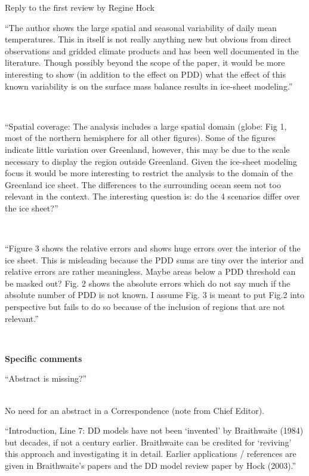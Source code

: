 \documentclass{letter}
\newcommand{\rev}[0]{\color{blue!50!black}\it}
\newcommand{\revpoint}[1]{{\rev\item``#1''}\\}
\begin{document}
\begin{letter}{Reply to the first review by Regine Hock}
\begin{enumerate}[resume]
    \revpoint{The author shows the large spatial and seasonal variability of daily mean temperatures. This in itself is not really anything new but obvious from direct observations and gridded climate products and has been well documented in the literature. Though possibly beyond the scope of the paper, it would be more interesting to show (in addition to the effect on PDD) what the effect of this known variability is on the surface mass balance results in ice-sheet modeling.}

    \revpoint{Spatial coverage: The analysis includes a large spatial domain (globe: Fig 1, most of the northern hemisphere for all other figures). Some of the figures indicate little variation over Greenland, however, this may be due to the scale necessary to display the region outside Greenland. Given the ice-sheet modeling focus it would be more interesting to restrict the analysis to the domain of the Greenland ice sheet. The differences to the surrounding ocean seem not too relevant in the context. The interesting question is: do the 4 scenarios differ over the ice sheet?}

    \revpoint{Figure 3 shows the relative errors and shows huge errors over the interior of the ice sheet. This is misleading because the PDD sums are tiny over the interior and relative errors are rather meaningless. Maybe areas below a PDD threshold can be masked out? Fig. 2 shows the absolute errors which do not say much if the absolute number of PDD is not known. I assume Fig. 3 is meant to put Fig.2 into perspective but fails to do so because of the inclusion of regions that are not relevant.}

\end{enumerate}


\textbf{Specific comments}

\begin{enumerate}[resume]

    \revpoint{Abstract is missing?}

    No need for an abstract in a Correspondence (note from Chief Editor).

    \revpoint{Introduction, Line 7: DD models have not been ‘invented’ by Braithwaite (1984) but decades, if not a century earlier. Braithwaite can be credited for ‘reviving’ this approach and investigating it in detail. Earlier applications / references are given in Braithwaite’s papers and the DD model review paper by Hock (2003).}


\end{enumerate}
\end{letter}
\end{document}
